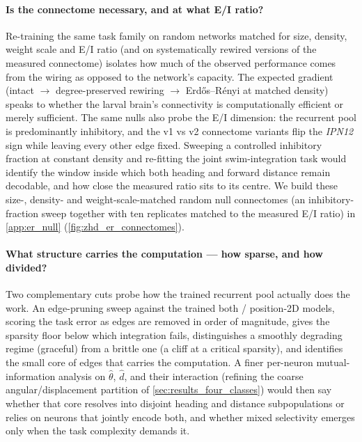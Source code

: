 \documentclass[11pt]{article}
\begin{document}
\paragraph{Is the connectome necessary, and at what E/I ratio?}\label{out:necessary}\label{out:ei}
Re-training the same task family on random networks matched for size,
density, weight scale and E/I ratio (and on systematically rewired
versions of the measured connectome) isolates how much of the observed
performance comes from the wiring as opposed to the network's capacity. The
expected gradient (intact $\to$ degree-preserved rewiring $\to$
Erd\H{o}s--R\'enyi at matched density) speaks to whether the larval brain's
connectivity is computationally efficient or merely sufficient. The same
nulls also probe the E/I dimension: the recurrent pool is predominantly
inhibitory, and the v1 vs v2 connectome variants flip the \emph{IPN12} sign
while leaving every other edge fixed. Sweeping a controlled inhibitory
fraction at constant density and re-fitting the joint swim-integration task
would identify the window inside which both heading and forward distance
remain decodable, and how close the measured ratio sits to its centre. We
build these size-, density- and weight-scale-matched random null
connectomes (an inhibitory-fraction sweep together with ten replicates
matched to the measured E/I ratio) in \cref{app:er_null}
(\cref{fig:zhd_er_connectomes}).

\paragraph{What structure carries the computation --- how sparse, and
how divided?}\label{out:sparsity}\label{out:mixed} Two complementary
cuts probe how the trained recurrent pool actually does the work. An
edge-pruning sweep against the trained both / position-2D models, scoring
the task error as edges are removed in order of magnitude, gives the
sparsity floor below which integration fails, distinguishes a smoothly
degrading regime (graceful) from a brittle one (a cliff at a critical
sparsity), and identifies the small core of edges that carries the
computation. A finer per-neuron mutual-information analysis on
$\hat\theta$, $\hat d$, and their interaction (refining the coarse
angular/displacement partition of \cref{sec:results_four_classes})
would then say whether that core resolves into disjoint heading and
distance subpopulations or relies on neurons that jointly encode both,
and whether mixed selectivity emerges only when the task complexity
demands it.
\end{document}
